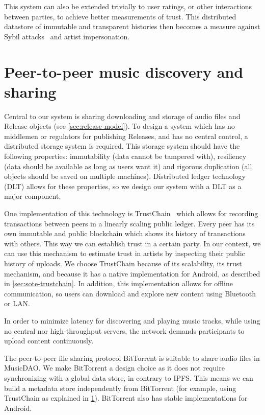 This system can also be extended trivially to user ratings, or other interactions between parties, to achieve better measurements of trust. This distributed datastore of immutable and transparent histories then becomes a measure against Sybil attacks~\citep{douceur2002sybil} and artist impersonation.

\section{Peer-to-peer music discovery and sharing}
\label{sec:distributed-storage}
Central to our system is sharing downloading and storage of audio files and Release objects (see \ref{sec:release-model}). To design a system which has no middlemen or regulators for publishing Releases, and has no central control, a distributed storage system is required. This storage system should have the following properties: immutability (data cannot be tampered with), resiliency (data should be available as long as users want it) and rigorous duplication (all objects should be saved on multiple machines). Distributed ledger technology (DLT) allows for these properties, so we design our system with a DLT as a major component.

One implementation of this technology is TrustChain~\citep{otte2017trustchain} which allows for recording transactions between peers in a linearly scaling public ledger. Every peer has its own immutable and public blockchain which shows its history of transactions with others. This way we can establish trust in a certain party. In our context, we can use this mechanism to estimate trust in artists by inspecting their public history of uploads. We choose TrustChain because of its scalability, its trust mechanism, and because it has a native implementation for Android, as described in \ref{sec:sote-trustchain}. In addition, this implementation allows for offline communication, so users can download and explore new content using Bluetooth or LAN.

\label{sec:p2p-music-sharing}
In order to minimize latency for discovering and playing music tracks, while using no central nor high-throughput servers, the network demands participants to upload content continuously. 

The peer-to-peer file sharing protocol BitTorrent is suitable to share audio files in MusicDAO. We make BitTorrent a design choice as it does not require synchronizing with a global data store, in contrary to IPFS. This means we can build a metadata store independently from BitTorrent (for example, using TrustChain as explained in \ref{sec:distributed-storage}). BitTorrent also has stable implementations for Android.

